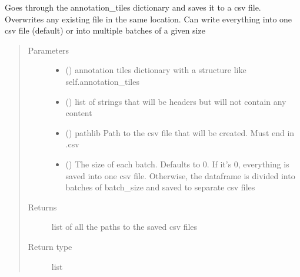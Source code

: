 \documentclass[letterpaper,10pt,english]{sphinxmanual}
\begin{document}
\begin{fulllineitems}
\begin{fulllineitems}
Goes through the annotation\_tiles dictionary and saves it to a csv file. Overwrites any existing file in
the same location. Can write everything into one csv file (default) or into multiple batches of a given size
\begin{quote}\begin{description}
\item[{Parameters}] \leavevmode\begin{itemize}
\item {} 
 () \textendash{} annotation tiles dictionary with a structure like self.annotation\_tiles

\item {} 
 () \textendash{} list of strings that will be headers but will not contain any content

\item {} 
 () \textendash{} pathlib Path to the csv file that will be created. Must end in .csv

\item {} 
 () \textendash{} The size of each batch. Defaults to 0. If it’s 0, everything is saved into one csv file.
Otherwise, the dataframe is divided into batches of batch\_size and saved to separate csv files

\end{itemize}

\item[{Returns}] \leavevmode
list of all the paths to the saved csv files

\item[{Return type}] \leavevmode
list

\end{description}\end{quote}

\end{fulllineitems}


\end{fulllineitems}

\label{\detokenize{index:module-stitch_MAPS_annotations}}
\end{document}
